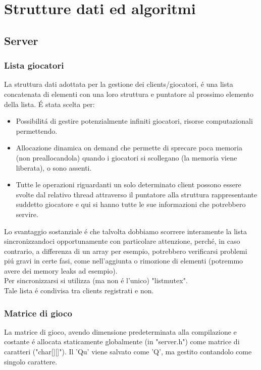 \chapter{Strutture dati ed algoritmi}

\section{Server}

\subsection{Lista giocatori}

La struttura dati adottata per la gestione dei clients/giocatori, \'e una lista concatenata di elementi con una loro struttura e puntatore al prossimo elemento della lista. \'E stata scelta per:

\begin{itemize}
\item Possibilit\'a di gestire potenzialmente infiniti giocatori, risorse computazionali permettendo.
\item Allocazione dinamica on demand che permette di sprecare poca memoria (non preallocandola) quando i giocatori si scollegano (la memoria viene liberata), o sono assenti.
\item Tutte le operazioni riguardanti un solo determinato client possono essere svolte dal relativo thread attraverso il puntatore alla struttura rappresentante suddetto giocatore e qui si hanno tutte le sue informazioni che potrebbero servire.
\end{itemize}
\leavevmode
Lo svantaggio sostanziale \'e che talvolta dobbiamo scorrere interamente la lista sincronizzandoci opportunamente con particolare attenzione, perch\'e, in caso contrario, a differenza di un array per esempio, potrebbero verificarsi problemi pi\'u gravi in certe fasi, come nell'aggiunta o rimozione di elementi (potremmo avere dei memory leaks ad esempio). 
\\
Per sincronizzarsi si utilizza (ma non \'e l'unico) "listmutex".
\\
Tale lista \'e condivisa tra clients registrati e non.
 \\
 
\subsection{Matrice di gioco}

La matrice di gioco, avendo dimensione predeterminata alla compilazione e costante \'e allocata staticamente globalmente (in "server.h") come matrice di caratteri ("char[][]"). Il 'Qu' viene salvato come 'Q', ma gestito contandolo come singolo carattere.
\\

